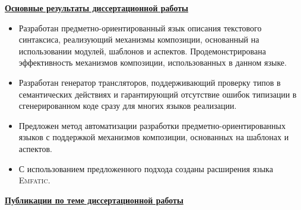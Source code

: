\documentclass[12pt,a4paper]{article}
\newcommand{\tool}[1]{\textsc{#1}}
\theoremstyle{definition}
\theoremstyle{plain}
\newcommand{\afsubsection}[1]{\par \textbf{\underline{#1}}}
\begin{document}
\afsubsection{Основные результаты диссертационной работы}
\begin{itemize}
\item Разработан предметно-ориентированный язык описания текстового синтаксиса, реализующий механизмы композиции, основанный на использовании модулей, шаблонов и аспектов. Продемонстрирована эффективность механизмов композиции, использованных в данном языке.
\item Разработан генератор трансляторов, поддерживающий проверку типов в семантических действиях и гарантирующий отсутствие ошибок типизации в сгенерированном коде сразу для многих языков реализации.
\item Предложен метод автоматизации разработки предметно-ориентированных языков с поддержкой механизмов композиции, основанных на шаблонах и аспектов.
\item С использованием предложенного подхода созданы расширения языка \tool{Emfatic}.
\end{itemize}

\par
\begin{center}
\afsubsection{Публикации по теме диссертационной работы}
\vspace{-40pt}
\end{center}
\makeatletter
\renewcommand\@biblabel[1]{#1.}
\makeatother
\renewcommand{\refname}{}

\end{document}
